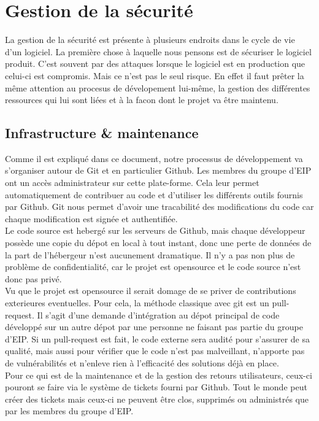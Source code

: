 \section{Gestion de la sécurité}

La gestion de la sécurité est présente à plusieurs endroits dans le cycle de vie d'un logiciel. La première chose à laquelle nous pensons est de sécuriser le logiciel produit. C'est souvent par des attaques lorsque le logiciel est en production que celui-ci est compromis. Mais ce n'est pas le seul risque. En effet il faut prêter la même attention au procesus de dévelopement lui-même, la gestion des différentes ressources qui lui sont liées et à la facon dont le projet va être maintenu.

\subsection{Infrastructure \& maintenance}

Comme il est expliqué dans ce document, notre processus de développement va s'organiser autour de Git et en particulier Github. Les membres du groupe d'EIP ont un accès administrateur sur cette plate-forme. Cela leur permet automatiquement de contribuer au code et d'utiliser les différents outils fournis par Github. Git nous permet d'avoir une tracabilité des modifications du code car chaque modification est signée et authentifiée.\\
Le code source est hebergé sur les serveurs de Github, mais chaque développeur possède une copie du dépot en local à tout instant, donc une perte de données de la part de l'hébergeur n'est aucunement dramatique. Il n'y a pas non plus de problème de confidentialité, car le projet est opensource et le code source n'est donc pas privé.\\
Vu que le projet est opensource il serait domage de se priver de contributions exterieures eventuelles. Pour cela, la méthode classique avec git est un pull-request. Il s'agit d'une demande d'intégration au dépot principal de code développé sur un autre dépot par une personne ne faisant pas partie du groupe d'EIP. Si un pull-request est fait, le code externe sera audité pour s'assurer de sa qualité, mais aussi pour vérifier que le code n'est pas malveillant, n'apporte pas de vulnérabilités et n'enleve rien à l'efficacité des solutions déjà en place.\\
Pour ce qui est de la maintenance et de la gestion des retours utilisateurs, ceux-ci pouront se faire via le système de tickets fourni par Github. Tout le monde peut créer des tickets mais ceux-ci ne peuvent être clos, supprimés ou administrés que par les membres du groupe d'EIP.

